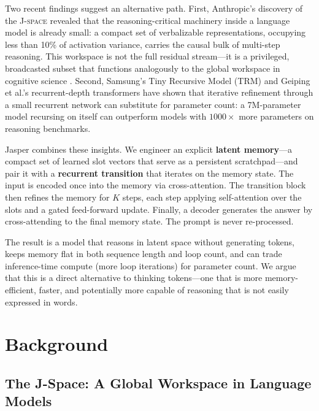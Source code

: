 \documentclass[11pt,a4paper]{article}
\newcommand{\jspace}{\textsc{J-space}}
\begin{document}
Two recent findings suggest an alternative path. First, Anthropic's discovery of the \jspace{} \citep{anthropic2026jspace} revealed that the reasoning-critical machinery inside a language model is already small: a compact set of verbalizable representations, occupying less than 10\% of activation variance, carries the causal bulk of multi-step reasoning. This workspace is not the full residual stream---it is a privileged, broadcasted subset that functions analogously to the global workspace in cognitive science \citep{baars2005global}. Second, Samsung's Tiny Recursive Model (TRM) \citep{jolicoeur2025trm} and Geiping et al.'s recurrent-depth transformers \citep{geiping2025recurrent} have shown that iterative refinement through a small recurrent network can substitute for parameter count: a 7M-parameter model recursing on itself can outperform models with $1000\times$ more parameters on reasoning benchmarks.

Jasper combines these insights. We engineer an explicit \textbf{latent memory}---a compact set of learned slot vectors that serve as a persistent scratchpad---and pair it with a \textbf{recurrent transition} that iterates on the memory state. The input is encoded once into the memory via cross-attention. The transition block then refines the memory for $K$ steps, each step applying self-attention over the slots and a gated feed-forward update. Finally, a decoder generates the answer by cross-attending to the final memory state. The prompt is never re-processed.

The result is a model that reasons in latent space without generating tokens, keeps memory flat in both sequence length and loop count, and can trade inference-time compute (more loop iterations) for parameter count. We argue that this is a direct alternative to thinking tokens---one that is more memory-efficient, faster, and potentially more capable of reasoning that is not easily expressed in words.

\section{Background}

\subsection{The J-Space: A Global Workspace in Language Models}
\end{document}
